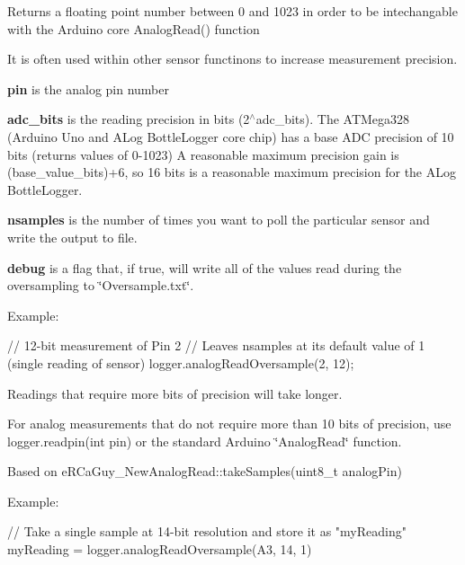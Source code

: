 Returns a floating point number between 0 and 1023 in order to be intechangable with the Arduino core Analog\+Read() function

It is often used within other sensor functinons to increase measurement precision.

{\bfseries pin} is the analog pin number

{\bfseries adc\+\_\+bits} is the reading precision in bits (2$^\wedge$adc\+\_\+bits). The A\+T\+Mega328 (Arduino Uno and A\+Log Bottle\+Logger core chip) has a base A\+DC precision of 10 bits (returns values of 0-\/1023) A reasonable maximum precision gain is (base\+\_\+value\+\_\+bits)+6, so 16 bits is a reasonable maximum precision for the A\+Log Bottle\+Logger.

{\bfseries nsamples} is the number of times you want to poll the particular sensor and write the output to file.

{\bfseries debug} is a flag that, if true, will write all of the values read during the oversampling to \char`\"{}\+Oversample.\+txt\char`\"{}.

Example\+: 
\begin{DoxyCode}
\textcolor{comment}{// 12-bit measurement of Pin 2}
\textcolor{comment}{// Leaves nsamples at its default value of 1 (single reading of sensor)}
logger.analogReadOversample(2, 12);
\end{DoxyCode}


Readings that require more bits of precision will take longer.

For analog measurements that do not require more than 10 bits of precision, use logger.\+readpin(int pin) or the standard Arduino \char`\"{}\+Analog\+Read\char`\"{} function.

Based on e\+R\+Ca\+Guy\+\_\+\+New\+Analog\+Read\+::take\+Samples(uint8\+\_\+t analog\+Pin)

Example\+: 
\begin{DoxyCode}
\textcolor{comment}{// Take a single sample at 14-bit resolution and store it as "myReading"}
myReading = logger.analogReadOversample(A3, 14, 1)
\end{DoxyCode}
